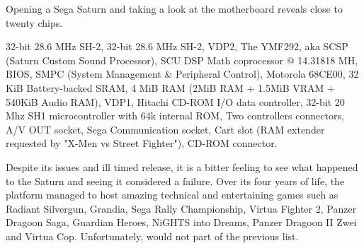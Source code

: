 \pagebreak

\label{arch_saturn}




\par
Opening a Sega Saturn and taking a look at the motherboard reveals close to twenty chips.\\
\par
{} 32-bit 28.6 MHz SH-2, 
 32-bit 28.6 MHz SH-2, 
 VDP2, 
 The YMF292, aka SCSP (Saturn Custom Sound Processor), 
 SCU DSP Math coprocessor @ 14.31818 MH, 
 BIOS, 
 SMPC (System Management \& Peripheral Control), 
 Motorola 68CE00, 
 32 KiB Battery-backed SRAM, 
 4 MiB RAM (2MiB RAM + 1.5MiB VRAM + 540KiB Audio RAM), 
 VDP1, 
 Hitachi CD-ROM I/O data controller, 
 32-bit 20 Mhz SH1  microcontroller with 64k internal ROM, 
 Two controllers connectors, 
 A/V OUT socket,  
 Sega Communication socket,  
 Cart slot (RAM extender requested by "X-Men vs Street Fighter"), 
 CD-ROM connector.






Despite its issues and ill timed release, it is a bitter feeling to see what happened to the Saturn and seeing it considered a failure. Over its four years of life, the platform managed to host amazing technical and entertaining games such as Radiant Silvergun, Grandia, Sega Rally Championship, Virtua Fighter 2, Panzer Dragoon Saga, Guardian Heroes, NiGHTS into Dreams, Panzer Dragoon II Zwei and Virtua Cop. Unfortunately, \doom{} would not part of the previous list.\\
\par
{}




























